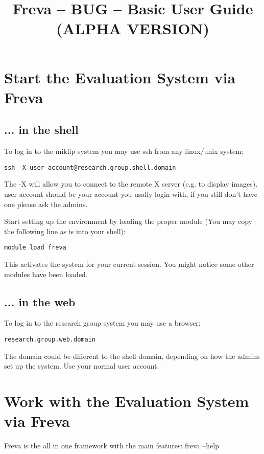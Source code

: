 \documentclass[a4paper,11pt]{ltxdoc}
\title{Freva -- BUG -- Basic User Guide (ALPHA VERSION)}
\begin{document}
\maketitle

\section{Start the Evaluation System via Freva}

\subsection*{... in the shell}
To log in to the miklip system you may use ssh from any linux/unix system:
\begin{verbatim} 
ssh -X user-account@research.group.shell.domain
\end{verbatim}

The -X will allow you to connect to the remote X server (e.g. to display images). user-account should be your account you usally login with, if you still don't have one please ask the admins.

Start setting up the environment by loading the proper module (You may copy the following line as is into your shell):
\begin{verbatim}
module load freva
\end{verbatim}

This activates the system for your current session. You might notice some other modules have been loaded.

\subsection*{... in the web}

To log in to the research group system you may use a browser:
\begin{verbatim} 
research.group.web.domain
\end{verbatim}

The domain could be different to the shell domain, depending on how the admins set up the system. Use your normal user account.

\section{Work with the Evaluation System via Freva}

Freva is the all in one framework with the main features: freva --help
\end{document}
